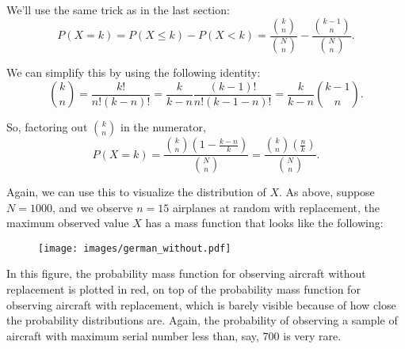 \documentclass[11pt]{article}
\begin{document}
We'll use the same trick as in the last section:
$$
    P(X = k) = P(X \leq k) - P(X < k) = \frac{{k \choose n}}{{N \choose n}} - \frac{{k-1 \choose n}}{{N \choose n}}.
$$

We can simplify this by using the following identity:
$$
    {k \choose n} = \frac{k!}{n!(k-n)!} = \frac{k}{k-n}\frac{(k-1)!}{n!(k-1-n)!} = \frac{k}{k-n} {k-1 \choose n}.
$$

So, factoring out ${k \choose n}$ in the numerator,
$$
P(X = k) = \frac{{k \choose n}\left(1 - \frac{k-n}{k}\right)}{{N \choose n}} = \frac{{k \choose n}\left(\frac{n}{k}\right)}{{N \choose n}}.
$$

Again, we can use this to visualize the distribution of $X$. As above, suppose $N = 1000$, and we observe $n = 15$ airplanes at random with replacement, the maximum observed value $X$ has a
mass function that looks like the following:

\begin{figure}[h!]
    \centering
    \texttt{[image: images/german\_without.pdf]}
\end{figure}

In this figure, the probability mass function for observing aircraft without replacement is plotted in red, on top of the probability mass function for observing aircraft with replacement, which is barely visible because of how close the probability distributions are. Again, the probability of observing a sample of aircraft with maximum serial number less than, say, 700 is very rare.
\end{document}

